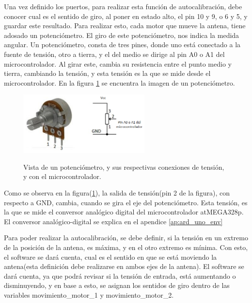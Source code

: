 Una vez definido los puertos, para realizar esta función de autocalibración, debe conocer cual es el sentido de giro, al poner en estado alto, el pin 10 y 9, o 6 y 5, y guardar este resultado. Para realizar esto, cada motor que mueve la antena, tiene adosado un potenciómetro. El giro de este potenciómetro, nos indica la medida angular. Un potenciómetro, consta de tres pines, donde uno está conectado a la fuente de tensión, otro a tierra, y el del medio se dirige al pin A0 o A1 del microcontrolador. Al girar este, cambia su resistencia entre el punto medio y tierra, cambiando la tensión, y esta tensión es la que se mide desde el microcontrolador. En la figura
\ref{fig:pot} se encuentra la imagen de un potenciómetro. 


\begin{figure}
	\centering
	\caption{Vista de un potenciómetro, y sus respectivas conexiones de tensión, y con el microcontrolador.}	
	\includegraphics[height=3.2cm]{pote}
	\label{fig:pot}	
\end{figure}


Como se observa en la figura(\ref{fig:pot}), la salida de tensión(pin 2 de la figura), con respecto a GND, cambia, cuando se gira el eje del potenciómetro. Esta tensión, es la que se mide el conversor analógico digital del microcontrolador atMEGA328p. El conversor analógico-digital se explica en el apendice \ref{ap:ard_uno_env}   

Para poder realizar la autocalibración, se debe definir, si la tensión en un extremo de la posición de la antena, es máxima, y en el otro extremo es mínima. Con esto, el software se dará cuenta, cual es el sentido en que se está moviendo la antena(esta definición debe realizarse en ambos ejes de la antena). El software se dará cuenta, ya que podrá revisar si la tensión de entrada, está aumentando o disminuyendo, y en base a esto, se asignan los sentidos de giro dentro de las variables movimiento\_motor\_1 y movimiento\_motor\_2. 

